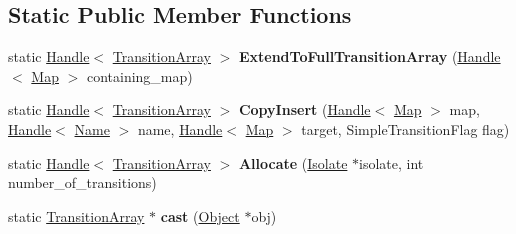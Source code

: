 \subsection*{Static Public Member Functions}
\begin{DoxyCompactItemize}
\item 
\hypertarget{classv8_1_1internal_1_1_transition_array_a6f1f5859adb929bbdb4c91b50f3d7a99}{}static \hyperlink{classv8_1_1internal_1_1_handle}{Handle}$<$ \hyperlink{classv8_1_1internal_1_1_transition_array}{Transition\+Array} $>$ {\bfseries Extend\+To\+Full\+Transition\+Array} (\hyperlink{classv8_1_1internal_1_1_handle}{Handle}$<$ \hyperlink{classv8_1_1internal_1_1_map}{Map} $>$ containing\+\_\+map)\label{classv8_1_1internal_1_1_transition_array_a6f1f5859adb929bbdb4c91b50f3d7a99}

\item 
\hypertarget{classv8_1_1internal_1_1_transition_array_abb54c16e2fd3c8ad739ff99e2ac084f4}{}static \hyperlink{classv8_1_1internal_1_1_handle}{Handle}$<$ \hyperlink{classv8_1_1internal_1_1_transition_array}{Transition\+Array} $>$ {\bfseries Copy\+Insert} (\hyperlink{classv8_1_1internal_1_1_handle}{Handle}$<$ \hyperlink{classv8_1_1internal_1_1_map}{Map} $>$ map, \hyperlink{classv8_1_1internal_1_1_handle}{Handle}$<$ \hyperlink{classv8_1_1internal_1_1_name}{Name} $>$ name, \hyperlink{classv8_1_1internal_1_1_handle}{Handle}$<$ \hyperlink{classv8_1_1internal_1_1_map}{Map} $>$ target, Simple\+Transition\+Flag flag)\label{classv8_1_1internal_1_1_transition_array_abb54c16e2fd3c8ad739ff99e2ac084f4}

\item 
\hypertarget{classv8_1_1internal_1_1_transition_array_a8d6dd01ebfa2cf9f8a78caa1da085a16}{}static \hyperlink{classv8_1_1internal_1_1_handle}{Handle}$<$ \hyperlink{classv8_1_1internal_1_1_transition_array}{Transition\+Array} $>$ {\bfseries Allocate} (\hyperlink{classv8_1_1internal_1_1_isolate}{Isolate} $\ast$isolate, int number\+\_\+of\+\_\+transitions)\label{classv8_1_1internal_1_1_transition_array_a8d6dd01ebfa2cf9f8a78caa1da085a16}

\item 
\hypertarget{classv8_1_1internal_1_1_transition_array_a203c68bfa913c9fb4bb48e7b74cac22d}{}static \hyperlink{classv8_1_1internal_1_1_transition_array}{Transition\+Array} $\ast$ {\bfseries cast} (\hyperlink{classv8_1_1internal_1_1_object}{Object} $\ast$obj)\label{classv8_1_1internal_1_1_transition_array_a203c68bfa913c9fb4bb48e7b74cac22d}

\end{DoxyCompactItemize}
